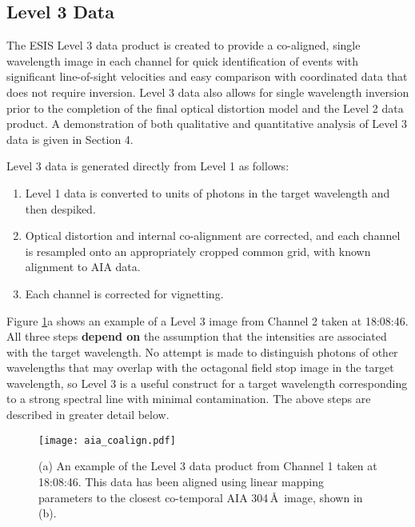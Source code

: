 \subsection{Level 3 Data} \label{sec:level 3}
 
    
\newcommand{\vigfit}{[.35, 0.28, 0.34, 0.6]}
\newcommand{\levthreetime}{18:08:46}

The ESIS Level 3 data product is created to provide a co-aligned, single wavelength image in each channel for quick identification of events with significant line-of-sight velocities and easy comparison with coordinated data that does not require inversion. 
Level 3 data also allows for single wavelength inversion prior to the completion of the final optical distortion model and the Level 2 data product.  A demonstration of both qualitative and quantitative analysis of Level 3 data is given in Section 4.  

Level 3 data is generated directly from Level 1 as follows:
\begin{enumerate}
    \item Level 1 data is converted to units of photons in the target wavelength and then despiked.\label{step:photons}
    \item Optical distortion and internal co-alignment are corrected, and each channel is resampled onto an appropriately cropped common grid, with known alignment to AIA data.\label{step:distortion}
    \item Each channel is corrected for vignetting.\label{step:vignetting}
\end{enumerate}
Figure \ref{fig:coalign}a shows an example of a Level 3 image from Channel 2 taken at \levthreetime. All three steps \textbf{depend on} the assumption that the intensities are associated with the target wavelength. No attempt is made to distinguish photons of other wavelengths that may overlap with the octagonal field stop image in the target wavelength, so Level 3 is a useful construct for a target wavelength corresponding to a strong spectral line with minimal contamination. The above steps are described in greater detail below.


	\begin{figure}
		\centering
		\texttt{[image: aia\_coalign.pdf]}
		\caption{(a) An example of the Level 3 data product from Channel 1 taken at \levthreetime. This data has been aligned using linear mapping parameters to the closest co-temporal AIA 304\,\AA\ image, shown in (b). }
		\label{fig:coalign}
	\end{figure}
    	
